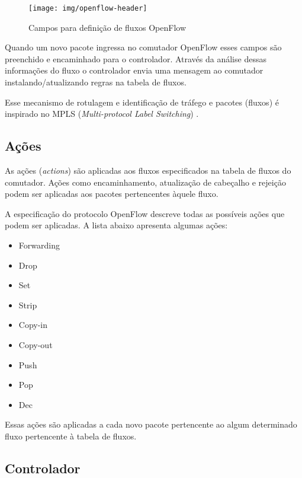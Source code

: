 \begin{figure}[h!]
    \centering
    \label{fig:of-header}
    \texttt{[image: img/openflow-header]}
    \caption{Campos para definição de fluxos OpenFlow}
\end{figure}

Quando um novo pacote ingressa no comutador OpenFlow esses campos são
preenchido e encaminhado para o controlador.
Através da análise dessas informações do fluxo o controlador envia uma
mensagem ao comutador instalando/atualizando regras na tabela de fluxos.

Esse mecanismo de rotulagem e identificação de tráfego e pacotes (fluxos) é
inspirado no MPLS (\emph{Multi-protocol Label Switching})
\citep{bruce2008mpls}.

\subsection{Ações}

As ações (\emph{actions}) são aplicadas aos fluxos especificados na tabela
de fluxos do comutador.
Ações como encaminhamento, atualização de cabeçalho e rejeição podem ser
aplicadas aos pacotes pertencentes àquele fluxo.

A especificação do protocolo OpenFlow \citep{ofprotocol2015} descreve todas
as possíveis ações que podem ser aplicadas.
A lista abaixo apresenta algumas ações:

\begin{multicols}{3}
    \begin{itemize}
        \item Forwarding
        \item Drop
        \item Set
        \item Strip
        \item Copy-in
        \item Copy-out
        \item Push
        \item Pop
        \item Dec
    \end{itemize}
\end{multicols}

Essas ações são aplicadas a cada novo pacote pertencente ao algum determinado
fluxo pertencente à tabela de fluxos.

\subsection{Controlador}

